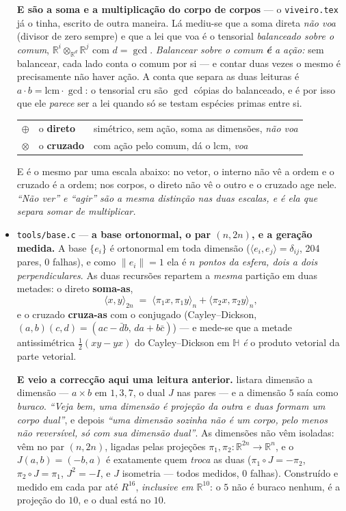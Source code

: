 \documentclass[11pt]{article}
\newcommand{\code}[1]{\texttt{\small #1}}
\newcommand{\R}{\mathbb R}
\newcommand{\Hq}{\mathbb H}
\theoremstyle{plain}
\theoremstyle{remark}
\begin{document}
\begin{itemize}
\textbf{E são a soma e a multiplicação do corpo de corpos} --- o \code{viveiro.tex} já o tinha,
escrito de outra maneira. Lá mediu-se que a soma direta \emph{não voa} (divisor de zero sempre) e
que a lei que voa é o tensorial \emph{balanceado sobre o comum}, $\R^i\otimes_{\R^d}\R^j$ com
$d=\gcd$. \emph{Balancear sobre o comum \textbf{é} a ação:} sem balancear, cada lado conta o comum
por si --- e contar duas vezes o mesmo é precisamente não haver ação. A conta que separa as duas
leituras é $a\cdot b=\mathrm{lcm}\cdot\gcd$: o tensorial cru são $\gcd$ cópias do balanceado, e é
por isso que ele \emph{parece} ser a lei quando só se testam espécies primas entre si.
\begin{center}
\begin{tabular}{lll}
$\oplus$ & o \textbf{direto} & simétrico, sem ação, soma as dimensões, \emph{não voa} \\
$\otimes$ & o \textbf{cruzado} & com ação pelo comum, dá o $\mathrm{lcm}$, \emph{voa} \\
\end{tabular}
\end{center}
E é o mesmo par uma escala abaixo: no vetor, o interno não vê a ordem e o cruzado é a ordem; nos
corpos, o direto não vê o outro e o cruzado age nele. \emph{``Não ver'' e ``agir'' são a mesma
distinção nas duas escalas, e é ela que separa somar de multiplicar.}

\item \code{tools/base.c} --- \textbf{a base ortonormal, o par $(n,2n)$, e a geração medida.} A
base $\{e_i\}$ é ortonormal em toda dimensão ($\langle e_i,e_j\rangle=\delta_{ij}$, 204 pares, 0
falhas), e como $\|e_i\|=1$ ela é \emph{$n$ pontos da esfera, dois a dois perpendiculares}. As
duas recursões repartem a \emph{mesma} partição em duas metades: o direto \textbf{soma-as},
\[
 \langle x,y\rangle_{2n} \;=\; \langle \pi_1x,\pi_1y\rangle_n + \langle \pi_2x,\pi_2y\rangle_n,
\]
e o cruzado \textbf{cruza-as} com o conjugado (Cayley--Dickson, $(a,b)(c,d)=(ac-\bar db,\,da+b\bar
c)$) --- e mede-se que a metade antissimétrica $\tfrac12(xy-yx)$ do Cayley--Dickson em $\Hq$
\emph{é} o produto vetorial da parte vetorial.

\textbf{E veio a correcção aqui uma leitura anterior.} listara dimensão a dimensão --- $a\times b$
em $1,3,7$, o dual $J$ nas pares --- e a dimensão $5$ saía como \emph{buraco}. \emph{``Veja bem,
uma dimensão é projeção da outra e duas formam um corpo dual''}, e depois \emph{``uma dimensão
sozinha não é um corpo, pelo menos não reversível, só com sua dimensão dual''}. As dimensões não
vêm isoladas: vêm no par $(n,2n)$, ligadas pelas projeções $\pi_1,\pi_2\colon\R^{2n}\to\R^n$, e o
$J(a,b)=(-b,a)$ é exatamente quem \emph{troca} as duas ($\pi_1\!\circ\!J=-\pi_2$,
$\pi_2\!\circ\!J=\pi_1$, $J^2=-I$, e $J$ isometria --- todos medidos, 0 falhas). Construído e
medido em cada par até $R^{16}$, \emph{inclusive em $\R^{10}$}: o $5$ não é buraco nenhum, é a
projeção do $10$, e o dual está no $10$.


\end{itemize}
\end{document}
